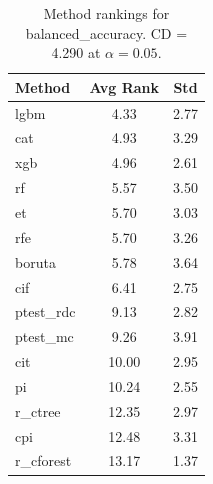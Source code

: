 \begin{table}[h]
\centering
\caption{Method rankings for balanced_accuracy. CD = 4.290 at $\alpha=0.05$.}
\label{tab:ranks_balanced_accuracy}
\begin{tabular}{lcc}
\toprule
Method & Avg Rank & Std \\
\midrule
lgbm & 4.33 & 2.77 \\
cat & 4.93 & 3.29 \\
xgb & 4.96 & 2.61 \\
rf & 5.57 & 3.50 \\
et & 5.70 & 3.03 \\
rfe & 5.70 & 3.26 \\
boruta & 5.78 & 3.64 \\
cif & 6.41 & 2.75 \\
ptest_rdc & 9.13 & 2.82 \\
ptest_mc & 9.26 & 3.91 \\
cit & 10.00 & 2.95 \\
pi & 10.24 & 2.55 \\
r_ctree & 12.35 & 2.97 \\
cpi & 12.48 & 3.31 \\
r_cforest & 13.17 & 1.37 \\
\bottomrule
\end{tabular}
\end{table}